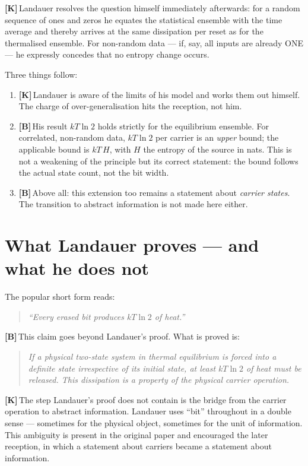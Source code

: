 \documentclass[11pt,a4paper]{article}
\newcommand{\LK}{\textcolor{layK}{\textbf{\footnotesize\textsf{[K]}}}\,}
\newcommand{\LB}{\textcolor{layB}{\textbf{\footnotesize\textsf{[B]}}}\,}
\theoremstyle{ffgft}
\begin{document}
\LK Landauer resolves the question himself immediately afterwards: for a random
sequence of ones and zeros he equates the statistical ensemble with the time
average and thereby arrives at the same dissipation per reset as for the
thermalised ensemble. For non-random data --- if, say, all inputs are already
\textup{ONE} --- he expressly concedes that no entropy change occurs.

Three things follow:

\begin{enumerate}[leftmargin=1.6em,itemsep=0.3em]
  \item \LK Landauer is aware of the limits of his model and works them out
        himself. The charge of over-generalisation hits the reception, not him.
  \item \LB His result $kT\ln 2$ holds strictly for the equilibrium ensemble. For
        correlated, non-random data, $kT\ln 2$ per carrier is an \emph{upper}
        bound; the applicable bound is $kT\,H$, with $H$ the entropy of the source
        in nats. This is not a weakening of the principle but its correct
        statement: the bound follows the actual state count, not the bit width.
  \item \LB Above all: this extension too remains a statement about
        \emph{carrier states}. The transition to abstract information is not made
        here either.
\end{enumerate}

\section{What Landauer proves --- and what he does not}

The popular short form reads:

\begin{quote}
\emph{“Every erased bit produces $kT\ln 2$ of heat.”}
\end{quote}

\LB This claim goes beyond Landauer's proof. What is proved is:

\begin{quote}
\emph{If a physical two-state system in thermal equilibrium is forced into a
definite state irrespective of its initial state, at least $kT\ln 2$ of heat must
be released. This dissipation is a property of the physical carrier operation.}
\end{quote}

\LK The step Landauer's proof does not contain is the bridge from the carrier
operation to abstract information. Landauer uses “bit” throughout in a double
sense --- sometimes for the physical object, sometimes for the unit of
information. This ambiguity is present in the original paper and encouraged the
later reception, in which a statement about carriers became a statement about
information.
\end{document}
